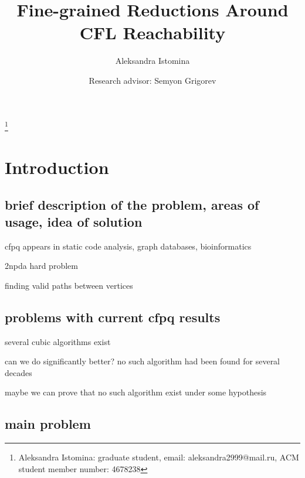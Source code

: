 \documentclass[acmsmall,review,nonacm]{acmart}\settopmatter{printfolios=true,printccs=false,printacmref=false}
\begin{document}
	
	\title{Fine-grained Reductions Around CFL Reachability}
	
	\author{Aleksandra Istomina}
	\thanks{Aleksandra Istomina: graduate student, email: aleksandra2999@mail.ru, ACM student member number: 4678238}

    \author{Research advisor: Semyon Grigorev}
	
	\newcommand\todo[1]{{\color{violet}#1}}
	\newcommand\db[1]{{\color{red}#1}}
	\newcommand\question[1]{{\color{cyan}#1}}


	\maketitle
	
	\section{Introduction}
	
	\subsection{\todo{brief description of the problem, areas of usage, idea of solution}}
	
	cfpq appears in static code analysis, graph databases, bioinformatics
	
	2npda hard problem
	
	finding valid paths between vertices
	
	\subsection{\todo{problems with current cfpq results}}
	
	several cubic algorithms exist
	
	can we do significantly better? no such algorithm had been found for several decades
	
	maybe we can prove that no such algorithm exist under some hypothesis
	
	\subsection{\todo{main problem}}
	
\end{document}

